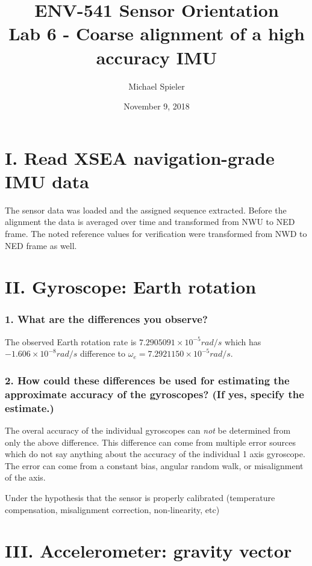 \documentclass{article}
\title{ENV-541 Sensor Orientation\\Lab 6 - Coarse alignment of a high accuracy IMU}
\author{Michael Spieler}
\date{November 9, 2018}
\newcommand{\e}[1]{\times 10^{#1}} %
\begin{document}
\maketitle

\section*{I. Read XSEA navigation-grade IMU data}

The sensor data was loaded and the assigned sequence extracted.
Before the alignment the data is averaged over time and transformed from NWU to NED frame.
The noted reference values for verification were transformed from NWD to NED frame as well.

\section*{II. Gyroscope: Earth rotation}


\subsubsection*{1. What are the differences you observe?}

The observed Earth rotation rate is $7.2905091\e{-5} \si{rad/s}$ which has $-1.606\e{-8} \si{rad/s}$ difference to $\omega_e =  7.2921150\e{-5} \si{rad/s}$.

\subsubsection*{2. How could these differences be used for estimating the approximate accuracy
of the gyroscopes? (If yes, specify the estimate.)}

The overal accuracy of the individual gyroscopes can \textit{not} be determined from only the above difference.
This difference can come from multiple error sources which do not say anything about the accuracy of the individual 1 axis gyroscope.
The error can come from a constant bias, angular random walk, or misalignment of the axis.

Under the hypothesis that the sensor is properly calibrated (temperature compensation, misalignment correction, non-linearity, etc)

\section*{III. Accelerometer: gravity vector}
\end{document}
